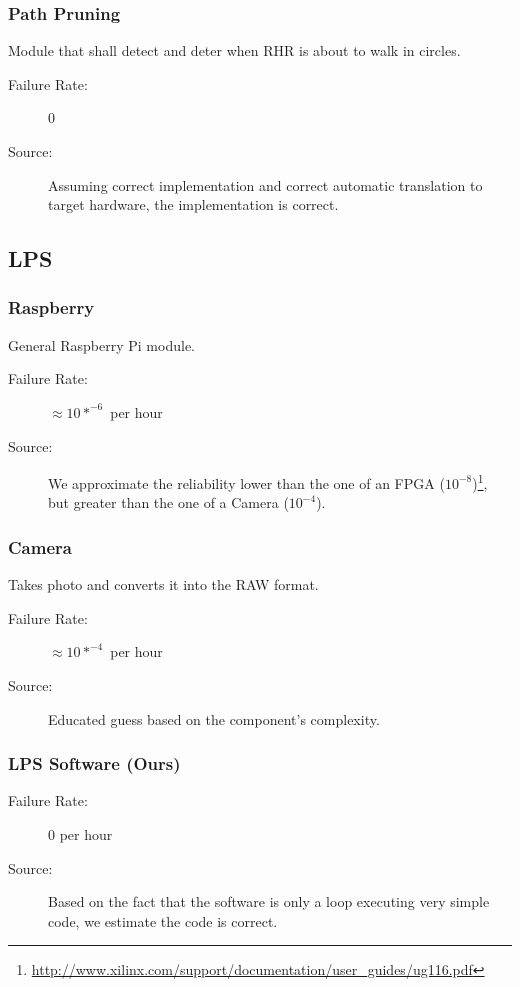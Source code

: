 \documentclass[a4paper,parskip,headheight=38pt]{scrartcl} %
\begin{document}
\subsubsection{Path Pruning}
Module that shall detect and deter when RHR is about to walk in circles.
\begin{description}
\item[Failure Rate:] 0
\item[Source:] Assuming correct implementation and correct automatic translation
to target hardware, the implementation is correct.
\end{description}

\subsection{LPS} %

\subsubsection{Raspberry}
General Raspberry Pi module.
\begin{description}
\item[Failure Rate:] $\approx 10*^{-6}$ per hour
\item[Source:] We approximate the reliability lower than the one of an FPGA ($10^{-8}$)\footnote{\url{http://www.xilinx.com/support/documentation/user_guides/ug116.pdf}}, but greater than the one of a Camera ($10^{-4}$).
\end{description}

\subsubsection{Camera}
Takes photo and converts it into the RAW format.
\begin{description}
\item[Failure Rate:] $\approx 10*^{-4}$ per hour %
\item[Source:] Educated guess based on the component's complexity.
\end{description}

\subsubsection{LPS Software (Ours)}
\begin{description}
\item[Failure Rate:] $0$ per hour
\item[Source:] Based on the fact that the software is only a loop
executing very simple code, we estimate the code is correct.
\end{description}
\end{document}
